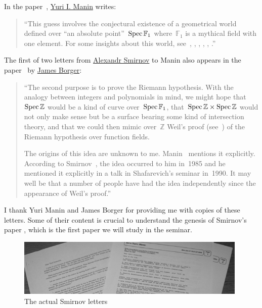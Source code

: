 In the paper~\cite{the-notion-of-dimension-in-geometry-and-algebra}, \href{http://en.wikipedia.org/wiki/Yuri_I._Manin}{Yuri I. Manin} writes:

\begin{quote}
  ``This guess involves the conjectural existence of a geometrical world defined over ``an absolute point''~$\operatorname{Spec}\mathbb{F}_1$ where~$\mathbb{F}_1$ is a mythical field with one element. For some insights about this world, see~\cite{sur-les-analogues-algebriques-des-groupes-semi-simples-complexes}, \cite{hurwitz-inequalities-for-number-fields}, \cite{letters-to-manin}, \cite{cohomology-determinants-and-reciprocity-laws}, \cite{three-dimensional-hyperbolic-geometry}, \cite{les-varietes-sur-le-corps-a-un-element}.''
\end{quote}

The first of two letters from \href{http://www.pdmi.ras.ru/eng/perso/smirnov.php}{Alexandr Smirnov} to Manin also appears in the paper~\cite{lambda-rings-and-the-field-with-one-element} by \href{http://maths.anu.edu.au/~borger/}{James Borger}:

\begin{quote}
  ``The second purpose is to prove the Riemann hypothesis. With the analogy between integers and polynomials in mind, we might hope that~$\operatorname{Spec}\mathbb{Z}$ would be a kind of curve over~$\operatorname{Spec}\mathbb{F}_1$, that~$\operatorname{Spec}\mathbb{Z}\times\operatorname{Spec}\mathbb{Z}$ would not only make sense but be a surface bearing some kind of intersection theory, and that we could then mimic over~$\mathbb{Z}$ Weil's proof (see~\cite{on-the-riemann-hypothesis-in-function-fields}) of the Riemann hypothesis over function fields.
  
  The origins of this idea are unknown to me. Manin~\cite{lectures-on-zeta-functions-and-motives} mentions it explicitly. According to Smirnov~\cite{letters-to-manin}, the idea occurred to him in~1985 and he mentioned it explicitly in a talk in Shafarevich's seminar in~1990. It may well be that a number of people have had the idea independently since the appearance of Weil's proof.''
\end{quote}

I thank Yuri Manin and James Borger for providing me with copies of these letters. Some of their content is crucial to understand the genesis of Smirnov's paper \cite{hurwitz-inequalities-for-number-fields}, which is the first paper we will study in the seminar.

\begin{figure}[ht!]
  \centering
  \includegraphics[width=11cm]{the-smirnov-letters/letters}
  \caption{The actual Smirnov letters}
  \label{figure:smirnov-letters}
\end{figure}

